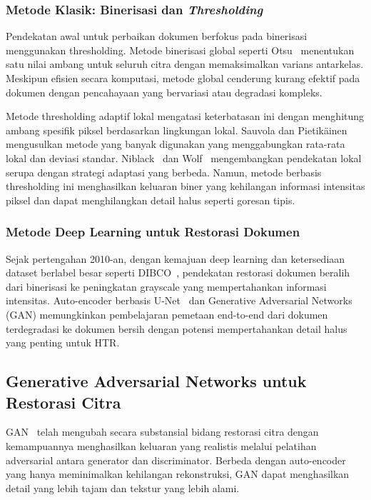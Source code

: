 \documentclass[journal]{IEEEtran}
\begin{document}
\subsubsection{Metode Klasik: Binerisasi dan \textit{Thresholding}}

Pendekatan awal untuk perbaikan dokumen berfokus pada binerisasi menggunakan thresholding. Metode binerisasi global seperti Otsu~\cite{otsu1979threshold} menentukan satu nilai ambang untuk seluruh citra dengan memaksimalkan varians antarkelas. Meskipun efisien secara komputasi, metode global cenderung kurang efektif pada dokumen dengan pencahayaan yang bervariasi atau degradasi kompleks.

Metode thresholding adaptif lokal mengatasi keterbatasan ini dengan menghitung ambang spesifik piksel berdasarkan lingkungan lokal. Sauvola dan Pietikäinen~\cite{sauvola2000adaptive} mengusulkan metode yang banyak digunakan yang menggabungkan rata-rata lokal dan deviasi standar. Niblack~\cite{niblack1986introduction} dan Wolf~\cite{wolf2004extraction} mengembangkan pendekatan lokal serupa dengan strategi adaptasi yang berbeda. Namun, metode berbasis thresholding ini menghasilkan keluaran biner yang kehilangan informasi intensitas piksel dan dapat menghilangkan detail halus seperti goresan tipis.

\subsubsection{Metode Deep Learning untuk Restorasi Dokumen}

Sejak pertengahan 2010-an, dengan kemajuan deep learning dan ketersediaan dataset berlabel besar seperti DIBCO~\cite{pratikakis2016hdibco}, pendekatan restorasi dokumen beralih dari binerisasi ke peningkatan grayscale yang mempertahankan informasi intensitas. Auto-encoder berbasis U-Net~\cite{ronneberger2015unet} dan Generative Adversarial Networks (GAN) memungkinkan pembelajaran pemetaan end-to-end dari dokumen terdegradasi ke dokumen bersih dengan potensi mempertahankan detail halus yang penting untuk HTR.

\subsection{Generative Adversarial Networks untuk Restorasi Citra}

GAN~\cite{goodfellow2016improved} telah mengubah secara substansial bidang restorasi citra dengan kemampuannya menghasilkan keluaran yang realistis melalui pelatihan adversarial antara generator dan discriminator. Berbeda dengan auto-encoder yang hanya meminimalkan kehilangan rekonstruksi, GAN dapat menghasilkan detail yang lebih tajam dan tekstur yang lebih alami.
\end{document}
